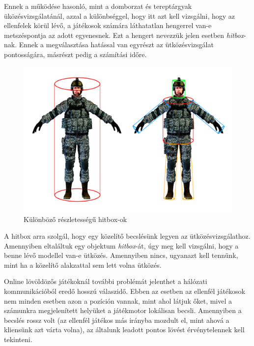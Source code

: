 
Ennek a működése hasonló, mint a domborzat és tereptárgyak üközésvizsgálatánál, azzal a különbséggel, hogy itt azt kell vizsgálni, hogy az ellenfelek körül lévő, a játékosok számára láthatatlan hengerrel van-e metszéspontja az adott egyenesnek. Ezt a hengert nevezzük jelen esetben \textit{hitbox}-nak. Ennek a megválasztása hatással van egyrészt az ütközésvizsgálat pontosságára, másrészt pedig a számítási időre.

\begin{figure}[htb]
\centering
\includegraphics[scale=0.38]{kepek/hitbox.png}
\caption{Különböző részletességű hitbox-ok}
\label{fig:hitbox}
\end{figure}

A hitbox arra szolgál, hogy egy közelítő becslésünk legyen az ütközésvizsgálathoz. Amennyiben eltaláltuk egy objektum \textit{hitbox}-át, úgy meg kell vizsgálni, hogy a benne lévő modellel van-e ütközés. Amennyiben nincs, ugyanazt kell tennünk, mint ha a közelítő alakzattal sem lett volna ütközés.

Online lövöldözős játékoknál további problémát jelenthet a hálózati kommunikációból eredő hosszú válaszidő. Ebben az esetben az ellenfél játékosok nem minden esetben azon a pozíción vannak, mint ahol látjuk őket, mivel a számunkra megjelenített helyüket a játékmotor lokálisan becsli. Amennyiben a becslés rossz volt (az ellenfél játékos más irányba mozdult el, mint ahová a kliensünk azt várta volna), az általunk leadott pontos lövést érvénytelennek kell tekinteni.


